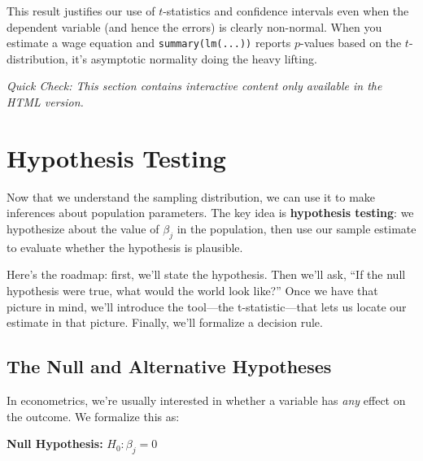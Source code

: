 \documentclass[
  letterpaper,
  DIV=11,
  numbers=noendperiod]{scrreprt}
\begin{document}
\begin{tcolorbox}[enhanced jigsaw, arc=.35mm, bottomrule=.15mm, bottomtitle=1mm, breakable, colback=white, colbacktitle=quarto-callout-note-color!10!white, colframe=quarto-callout-note-color-frame, coltitle=black, left=2mm, leftrule=.75mm, opacityback=0, opacitybacktitle=0.6, rightrule=.15mm, title=\textcolor{quarto-callout-note-color}{\faInfo}\hspace{0.5em}{Practical Implication}, titlerule=0mm, toprule=.15mm, toptitle=1mm]

This result justifies our use of \(t\)-statistics and confidence
intervals even when the dependent variable (and hence the errors) is
clearly non-normal. When you estimate a wage equation and
\texttt{summary(lm(...))} reports \(p\)-values based on the
\(t\)-distribution, it's asymptotic normality doing the heavy lifting.

\end{tcolorbox}

\emph{Quick Check: This section contains interactive content only
available in the HTML version.}

\section{Hypothesis Testing}\label{hypothesis-testing}

Now that we understand the sampling distribution, we can use it to make
inferences about population parameters. The key idea is
\textbf{hypothesis testing}: we hypothesize about the value of
\(\beta_j\) in the population, then use our sample estimate to evaluate
whether the hypothesis is plausible.

Here's the roadmap: first, we'll state the hypothesis. Then we'll ask,
``If the null hypothesis were true, what would the world look like?''
Once we have that picture in mind, we'll introduce the tool---the
t-statistic---that lets us locate our estimate in that picture. Finally,
we'll formalize a decision rule.

\subsection{The Null and Alternative
Hypotheses}\label{the-null-and-alternative-hypotheses}

In econometrics, we're usually interested in whether a variable has
\emph{any} effect on the outcome. We formalize this as:

\textbf{Null Hypothesis:} \(H_0: \beta_j = 0\)
\end{document}

